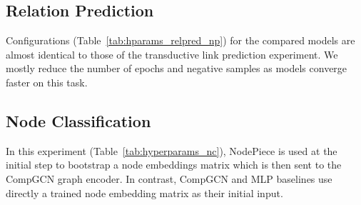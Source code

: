 \documentclass{article} \usepackage{iclr2022_conference,times}
\begin{document}
\subsection{Relation Prediction}

Configurations (Table~\ref{tab:hparams_relpred_np}) for the compared models are almost identical to those of the transductive link prediction experiment. 
We mostly reduce the number of epochs and negative samples as models converge faster on this task.

\begin{table}[!h]
\centering
\caption{Hyperparameters for relation prediction experiments. The content is largely identical to Table~\ref{tab:hyperparams_np}, only changed parameters are listed}
\label{tab:hparams_relpred_np}
\end{table}

\subsection{Node Classification}

In this experiment (Table~\ref{tab:hyperparams_nc}), NodePiece is used at the initial step to bootstrap a node embeddings matrix which is then sent to the CompGCN graph encoder. In contrast, CompGCN and MLP baselines use directly a trained node embedding matrix as their initial input.
\end{document}
